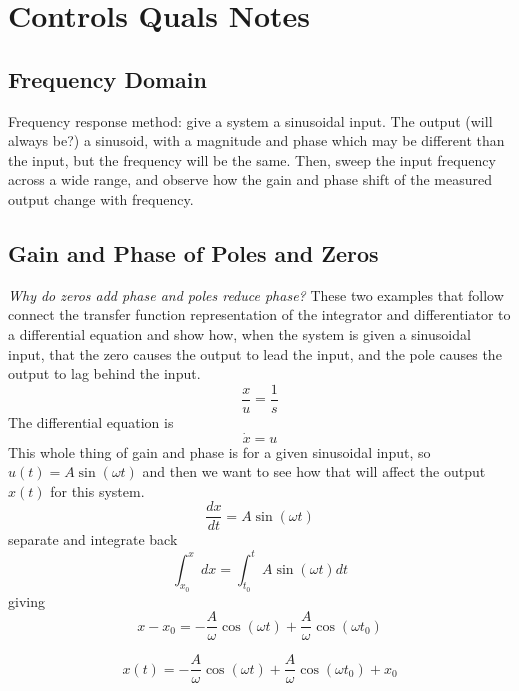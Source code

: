 \section{Controls Quals Notes}

\subsection{Frequency Domain}

Frequency response method: give a system a sinusoidal input.
The output (will always be?) a sinusoid, with a magnitude and phase which may be different than the input, but the frequency will be the same.
Then, sweep the input frequency across a wide range, and observe how the gain and phase shift of the measured output change with frequency.

\subsection{Gain and Phase of Poles and Zeros}

\textit{Why do zeros add phase and poles reduce phase?}
These two examples that follow connect the transfer function representation of the integrator and differentiator to a differential equation and show how, when the system is given a sinusoidal input, that the zero causes the output to lead the input, and the pole causes the output to lag behind the input.
\begin{equation*}
  \frac{x}{u}=\frac{1}{s}
\end{equation*}
The differential equation is
\begin{equation*}
  \dot{x}=u
\end{equation*}
This whole thing of gain and phase is for a given sinusoidal input, so $u(t)=A\sin(\omega t)$ and then we want to see how that will affect the output $x(t)$ for this system.
\begin{equation*}
  \frac{dx}{dt}=A\sin(\omega t)
\end{equation*}
separate and integrate back
\begin{equation*}
  \int_{x_{0}}^{x} dx=\int_{t_{0}}^{t} A\sin(\omega t)dt
\end{equation*}
giving
\begin{equation*}
  x-x_{0}=-\frac{A}{\omega}\cos(\omega t)+\frac{A}{\omega}\cos(\omega t_{0})
\end{equation*}

\begin{equation*}
  x(t)=-\frac{A}{\omega}\cos(\omega t)+\frac{A}{\omega}\cos(\omega t_{0})+x_{0}
\end{equation*}

